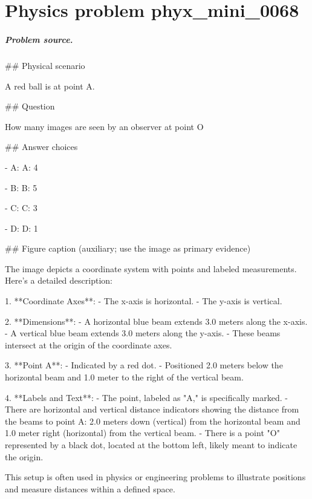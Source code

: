 
\chapter{Physics problem phyx\_mini\_0068}
\label{ch:PhyXMiniProblems_problem_phyx_mini_0068}

\paragraph{Problem source.}
\#\# Physical scenario

A red ball is at point A.

\#\# Question

How many images are seen by an observer at point O

\#\# Answer choices

- A: A: 4

- B: B: 5

- C: C: 3

- D: D: 1

\#\# Figure caption (auxiliary; use the image as primary evidence)

The image depicts a coordinate system with points and labeled measurements. Here's a detailed description:

1. **Coordinate Axes**: 
   - The x-axis is horizontal.
   - The y-axis is vertical.

2. **Dimensions**:
   - A horizontal blue beam extends 3.0 meters along the x-axis.
   - A vertical blue beam extends 3.0 meters along the y-axis.
   - These beams intersect at the origin of the coordinate axes.

3. **Point A**:
   - Indicated by a red dot.
   - Positioned 2.0 meters below the horizontal beam and 1.0 meter to the right of the vertical beam. 

4. **Labels and Text**:
   - The point, labeled as "A," is specifically marked.
   - There are horizontal and vertical distance indicators showing the distance from the beams to point A: 2.0 meters down (vertical) from the horizontal beam and 1.0 meter right (horizontal) from the vertical beam.
   - There is a point "O" represented by a black dot, located at the bottom left, likely meant to indicate the origin.

This setup is often used in physics or engineering problems to illustrate positions and measure distances within a defined space.


